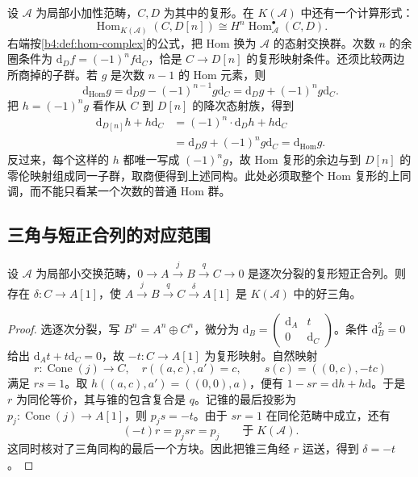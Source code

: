 \ProseParagraphBreak
设 \(\mathcal A\) 为局部小加性范畴，\(C,D\) 为其中的复形。在 \(K(\mathcal A)\) 中还有一个计算形式：
\[
	\operatorname{Hom}_{K(\mathcal A)}(C,D[n]) \cong H^n\operatorname{Hom}_{\mathcal A}^{\bullet}(C,D).
\]
右端按\cref{b4:def:hom-complex}的公式，把 Hom 换为 \(\mathcal A\) 的态射交换群。次数 \(n\) 的余圈条件为 \(\mathrm{d}_Df=(-1)^nf\mathrm{d}_C\)，恰是 \(C\to D[n]\) 的复形映射条件。还须比较两边所商掉的子群。若 \(g\) 是次数 \(n-1\) 的 Hom 元素，则
\[
	\mathrm{d}_{\operatorname{Hom}}g =\mathrm{d}_Dg-(-1)^{n-1}g\mathrm{d}_C =\mathrm{d}_Dg+(-1)^ng\mathrm{d}_C.
\]
把 \(h=(-1)^ng\) 看作从 \(C\) 到 \(D[n]\) 的降次态射族，得到
\[
	\begin{aligned}
		\mathrm{d}_{D[n]}h+h\mathrm{d}_C &=(-1)^n\cdot\mathrm{d}_Dh+h\mathrm{d}_C\\
		&=\mathrm{d}_Dg+(-1)^ng\mathrm{d}_C =\mathrm{d}_{\operatorname{Hom}}g.
	\end{aligned}
\]
反过来，每个这样的 \(h\) 都唯一写成 \((-1)^ng\)，故 Hom 复形的余边与到 \(D[n]\) 的零伦映射组成同一子群，取商便得到上述同构。此处必须取整个 Hom 复形的上同调，而不能只看某一个次数的普通 Hom 群。

\subsection{三角与短正合列的对应范围}
\label{b4:subsec:1603:03}

\begin{proposition}\label{b4:prop:degreewise-split-triangle}
	设 \(\mathcal A\) 为局部小交换范畴，\(0\to A\xrightarrow{j}B\xrightarrow{q}C\to0\) 是逐次分裂的复形短正合列。则存在 \(\delta:C\to A[1]\)，使 \(A\xrightarrow{j}B\xrightarrow{q}C\xrightarrow{\delta}A[1]\) 是 \(K(\mathcal A)\) 中的好三角。
\end{proposition}
\begin{proof}
	选逐次分裂，写 \(B^n=A^n\oplus C^n\)，微分为
	\(\mathrm{d}_B=\left(\begin{smallmatrix}\mathrm{d}_A&t\\0&\mathrm{d}_C\end{smallmatrix}\right)\)。条件 \(\mathrm{d}_B^2=0\) 给出 \(\mathrm{d}_At+t\mathrm{d}_C=0\)，故 \(-t:C\to A[1]\) 为复形映射。自然映射
	\[
		r:\operatorname{Cone}(j)\to C,\quad r((a,c),a')=c, \qquad s(c)=((0,c),-tc)
	\]
	满足 \(rs=1\)。取 \(h((a,c),a')=((0,0),a)\)，便有 \(1-sr=\mathrm{d}h+h\mathrm{d}\)。于是 \(r\) 为同伦等价，其与锥的包含复合是 \(q\)。记锥的最后投影为 \(p_j:\operatorname{Cone}(j)\to A[1]\)，则 \(p_js=-t\)。由于 \(sr=1\) 在同伦范畴中成立，还有
	\[
		(-t)r=p_jsr=p_j\qquad\text{于}\;K(\mathcal A).
	\]
	这同时核对了三角同构的最后一个方块。因此把锥三角经 \(r\) 运送，得到 \(\delta=-t\)。
\end{proof}

